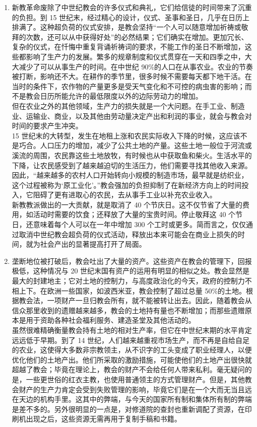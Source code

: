 \begin{enumerate}
    \item 新教革命废除了中世纪教会的许多仪式和典礼，它们给信徒的时间带来了沉重的负担。到 15 世纪末，经过精心的设计，仪式、圣事和圣日，几乎在日历上排满了。这种超负荷的仪式安排，是教会坚持“一个人可以随意增加祈祷或敬拜的次数，还可以从中获得好处”的必然结果；它们确实在增加。更加冗长、复杂的仪式，在忏悔中重复背诵祈祷词的要求，不能工作的圣日不断增加，这些都影响了生产力的发展。繁多的规章制度和仪式贯穿在一天和四季之中，大大减少了可以从事生产的时间。在中世纪 90\%的人口在从事农业。农业的节奏被打断，影响还不大。在耕作的季节里，很多时候不需要每天都下地干活。在当时的条件下，农作物的产量更多是受天气变化和不可控的病虫害的影响；而不是教会日历所能允许的最低限度以外的边际劳动力的增加。\\ 但在农业之外的其他领域，生产力的损失就是一个大问题。在手工业、制造业、运输业、商业，以及其他由劳动量决定产出和利润的事业，就会与教会对时间的要求产生冲突。\\ 15 世纪末的大转型，发生在地租上涨和农民实际收入下降的时候，这应该不是巧合。人口压力的增加，减少了公共土地的产量。这些土地一般位于河流或溪流的周围，农民靠这些土地放牧，有时候也从中获取鱼和柴火。生活水平的下降，让农民感受到了越来越迫切的生活压力，他们需要寻找其他收入来源。因此，“越来越多的农村人口开始转向小规模的制造市场，最早就是纺织业，这个过程被称为‘原工业化’。”教会强加的负担抑制了在新经济方向上的时间投入，它阻碍了更有进取心的农民，去从事手工业以补充农业收入。\\ 新教教派做出的一大贡献，就是取消了 40 个节庆日。这不仅节省了大量的费用，如活动时需要的饮食；还释放了大量的宝贵时间。停止敬拜这 40 个节日，还意味着每个人可以在一年中增加 300 个工时或更多。简而言之，仅仅通过取消中世纪教会超负荷的仪式活动，释放出本来可能会在商业上损失的时间，就为社会产出的显著提高打开了局面。
    \item 垄断地位被打破后，教会吐出了大量的资产。这些资产在教会的管理下，回报极低，这种情况与 20 世纪末国有资产的运用有明显的相似之处。教会显然是最大的封建地主；它对土地的控制力，与高度政治化的今天，政府的控制力不相上下。在欧洲一些国家，如波西米亚，教会控制了超过总量 50\%的土地。根据教会法，一项财产一旦归教会所有，就不能被转让出去。因此，随着教会从信众那里收到的遗赠越来越多，教会的土地持有量也不断增加；而那些遗赠原本是用于资助各种社会福利服务、建造圣堂及其他活动的。\\ 虽然很难精确衡量教会持有土地的相对生产率，但它在中世纪末期的水平肯定远远低于早期。到了 14 世纪，人们越来越重视市场生产，而不再是自给自足的农业，这使得大多数非宗教领主，从不识字的工头变成了职业经理人，以便优化他们的土地产出。他们所采取的激励措施，可能使他们的土地产出很快就超越了教会；毕竟在理论上，教会的财产不会给任何人带来私利。毫无疑问的是，一些更世俗的红衣主教，也使用普通领主的方式管理财产。但是，其他教会财产的生产力肯定会受到失败管理的影响，毕竟它们是在一个大而无当且远在天边的机构手里。这其中的弊端，与今天的国家所有制和集体所有制的弊端是差不多的。另外很明显的一点是，对修道院的查封也重新调配了资源，在印刷机出现之后，这些资源无需再用于复制手稿和书籍。

\end{enumerate}

